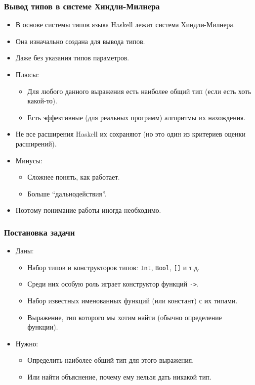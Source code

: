 \documentclass[11pt]{beamer}
\begin{document}
\begin{frame}[fragile]
  \frametitle{Вывод типов в системе Хиндли-Милнера}
  \begin{itemize}
    \item В основе системы типов языка Haskell лежит система Хиндли-Милнера.
    \item Она изначально создана для вывода типов.
          \pause
    \item Даже без указания типов параметров.
          \pause
    \item Плюсы:
          \begin{itemize}
            \pause
            \item Для любого данного выражения есть наиболее общий тип (если есть хоть какой-то).
                  \pause
            \item Есть эффективные (для реальных программ) алгоритмы их нахождения.
          \end{itemize}
          \pause
    \item Не все расширения Haskell их сохраняют (но это один из критериев оценки расширений).
          \pause
    \item Минусы:
          \begin{itemize}
            \pause
            \item Сложнее понять, как работает.
                  \pause
            \item Больше \enquote{дальнодействия}.
          \end{itemize}
          \pause
    \item Поэтому понимание работы иногда необходимо.
  \end{itemize}
\end{frame}

\begin{frame}[fragile]
  \frametitle{Постановка задачи}
  \begin{itemize}
    \item Даны:
          \begin{itemize}
            \item Набор типов и конструкторов типов: \lstinline|Int|, \lstinline|Bool|, \lstinline|[]| и т.д.
            \item Среди них особую роль играет конструктор функций \lstinline|->|.
            \item Набор известных именованных функций (или констант) с их типами.
            \item Выражение, тип которого мы хотим найти (обычно определение функции).
          \end{itemize}
          \pause
    \item Нужно:
          \begin{itemize}
            \item Определить наиболее общий тип для этого выражения.
                  \pause
            \item Или найти объяснение, почему ему нельзя дать никакой тип.
          \end{itemize}
  \end{itemize}
\end{frame}
\end{document}
